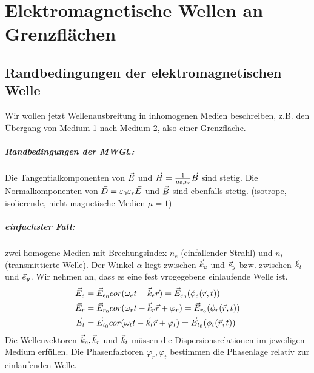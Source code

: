 




\chapter{Elektromagnetische Wellen an Grenzflächen}
\section{Randbedingungen der elektromagnetischen Welle}
Wir wollen jetzt Wellenausbreitung in inhomogenen Medien beschreiben, z.B. den Übergang von Medium 1 nach Medium 2, also einer Grenzfläche.
\paragraph{Randbedingungen der MWGl.:} Die Tangentialkomponenten von $\vec{E}$ und $\vec{H}=\frac{1}{\mu_0\mu_r}\vec{B}$ sind stetig. Die Normalkomponenten von $\vec{D}=\varepsilon_0\varepsilon_r\vec{E}$ und $\vec{B}$ sind ebenfalls stetig. (isotrope, isolierende, nicht magnetische Medien $\mu=1$)
\paragraph{einfachster Fall:}zwei homogene Medien mit Brechungsindex $n_e$ (einfallender Strahl) und $n_t$ (transmittierte Welle).
%
%
 Der Winkel $\alpha$ liegt zwischen $\vec{k}_e$ und $\vec{e}_y$ bzw. zwischen $\vec{k}_t$ und $\vec{e}_y$. Wir nehmen an, dass es eine fest vrogegebene einlaufende Welle ist.
 \begin{align*}
 	\vec{E}_e&=\vec{E}_{e_0}cor(\omega_et-\vec{k}_e\vec{r})=\vec{E}_{e_0}(\phi_e(\vec{r},t))\\
	\vec{E}_r&=\vec{E}_{r_0}cor(\omega_rt-\vec{k}_r\vec{r}+\varphi_r)=\vec{E}_{r_0}(\phi_r(\vec{r},t))\\
	\vec{E}_t&=\vec{E}_{t_0}cor(\omega_tt-\vec{k}_t\vec{r}+\varphi_t)=\vec{E}_{t_0}(\phi_t(\vec{r},t))
 \end{align*}
 Die Wellenvektoren $\vec{k}_e,\vec{k}_r$ und $\vec{k}_t$ müssen die Dispersionsrelationen im jeweiligen Medium erfüllen. Die Phasenfaktoren $\varphi_r,\varphi_t$ bestimmen die Phasenlage relativ zur einlaufenden Welle.